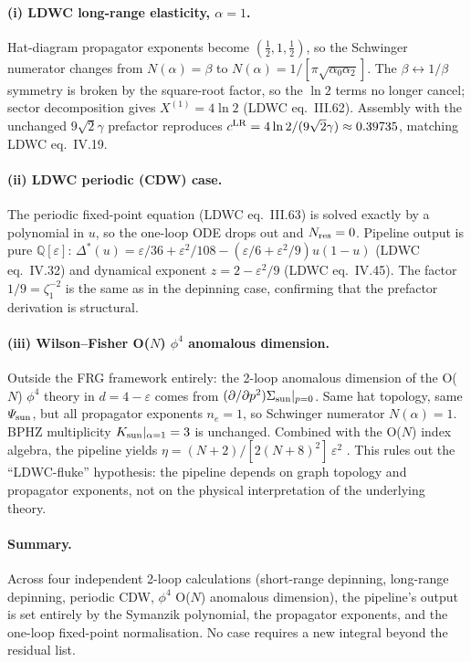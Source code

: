 \documentclass[10pt,a4paper,twocolumn]{article}
\theoremstyle{plain}
\theoremstyle{definition}
\renewcommand{\Psi}{\varPsi}
\newcommand{\eps}{\varepsilon}
\newcommand{\Nres}{N_{\rm res}}
\begin{document}
\paragraph{(i) LDWC long-range elasticity, $\alpha=1$.}
Hat-diagram propagator exponents become $(\tfrac{1}{2}, 1,
\tfrac{1}{2})$, so the Schwinger numerator changes from
$N(\alpha)=\beta$ to $N(\alpha) = 1/[\pi\sqrt{\alpha_0\alpha_2}]$.
The $\beta\leftrightarrow 1/\beta$ symmetry is broken by the
square-root factor, so the $\ln 2$ terms no longer cancel;
sector decomposition gives $X^{(1)} = 4\ln 2$ (LDWC
eq.~III.62).  Assembly with the unchanged $9\sqrt{2}\gamma$
prefactor reproduces $c^{\rm LR} = 4\ln 2/(9\sqrt{2}\gamma)
\approx 0.39735$, matching LDWC eq.~IV.19.

\paragraph{(ii) LDWC periodic (CDW) case.}
The periodic fixed-point equation (LDWC eq.~III.63) is solved
exactly by a polynomial in $u$, so the one-loop ODE drops out
and $\Nres = 0$.  Pipeline output is pure $\mathbb{Q}[\eps]$:
$\Delta^*(u) = \eps/36 + \eps^2/108 - (\eps/6 + \eps^2/9)u(1{-}u)$
(LDWC eq.~IV.32) and dynamical exponent $z = 2 - \eps^2/9$
(LDWC eq.~IV.45).  The factor $1/9 = \zeta_1^{-2}$ is the same
as in the depinning case, confirming that the prefactor
derivation is structural.

\paragraph{(iii) Wilson--Fisher O($N$) $\phi^4$ anomalous dimension.}
Outside the FRG framework entirely: the 2-loop anomalous
dimension of the O($N$) $\phi^4$ theory in $d = 4-\eps$ comes from
$(\partial/\partial p^2)\Sigma_{\rm sun}|_{p=0}$.  Same hat
topology, same $\Psi_{\rm sun}$, but all propagator exponents
$n_e = 1$, so Schwinger numerator $N(\alpha) = 1$.  BPHZ
multiplicity $K_{\rm sun}|_{\alpha=1} = 3$ is unchanged.
Combined with the O($N$) index algebra, the pipeline yields
$\eta = (N{+}2)/[2(N{+}8)^2]\,\eps^2$
\citep{KleinertSchulte-Frohlinde,ZinnJustin}.
This rules out the ``LDWC-fluke'' hypothesis: the pipeline
depends on graph topology and propagator exponents, not on
the physical interpretation of the underlying theory.

\paragraph{Summary.}
Across four independent 2-loop calculations (short-range
depinning, long-range depinning, periodic CDW, $\phi^4$ O($N$)
anomalous dimension), the pipeline's output is set entirely by
the Symanzik polynomial, the propagator exponents, and the
one-loop fixed-point normalisation.  No case requires a new
integral beyond the residual list.
\end{document}
